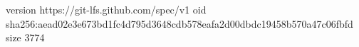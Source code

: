 version https://git-lfs.github.com/spec/v1
oid sha256:aead02e3e673bd1fc4d795d3648cdb578eafa2d00dbdc19458b570a47c06fbfd
size 3774
